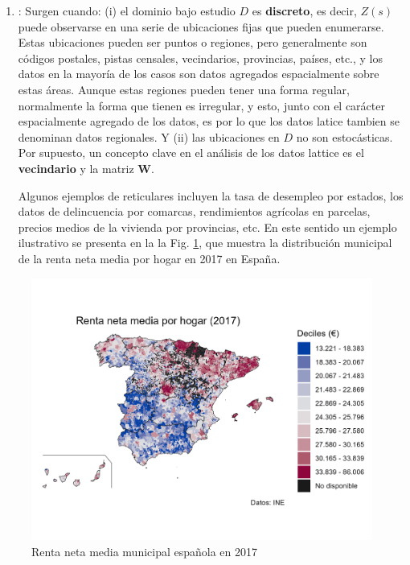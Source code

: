 \documentclass[
]{book}
\theoremstyle{definition}
\theoremstyle{definition}
\theoremstyle{definition}
\theoremstyle{definition}
\theoremstyle{remark}
\begin{document}
\begin{enumerate}
\def\labelenumi{\arabic{enumi}.}
\setcounter{enumi}{1}
\item
  \textbf{}: Surgen cuando: (i) el dominio bajo estudio \(D\) es
  \textbf{discreto}, es decir, \(Z(s)\) puede observarse en una serie de ubicaciones
  fijas que pueden enumerarse. Estas ubicaciones pueden ser puntos o regiones,
  pero generalmente son códigos postales, pistas censales, vecindarios,
  provincias, países, etc., y los datos en la mayoría de los casos son datos
  agregados espacialmente sobre estas áreas. Aunque estas regiones pueden
  tener una forma regular, normalmente la forma que tienen es irregular, y
  esto, junto con el carácter espacialmente agregado de los datos, es por lo
  que los datos latice tambien se denominan datos regionales. Y (ii) las
  ubicaciones en \(D\) no son estocásticas. Por supuesto, un concepto clave en
  el análisis de los datos lattice es el \textbf{vecindario} y la matriz \textbf{W}.

  Algunos ejemplos de reticulares incluyen la tasa de desempleo por estados,
  los datos de delincuencia por comarcas, rendimientos agrícolas en parcelas,
  precios medios de la vivienda por provincias, etc. En este sentido un
  ejemplo ilustrativo se presenta en la la Fig. \ref{fig:ejem-lattice}, que
  muestra la distribución municipal de la renta neta media por hogar en 2017
  en España.
\end{enumerate}

\begin{figure}

{\centering \includegraphics[width=0.6\linewidth]{img/renta2017} 

}

\caption{Renta neta media municipal española en 2017}\label{fig:ejem-lattice}
\end{figure}
\end{document}
